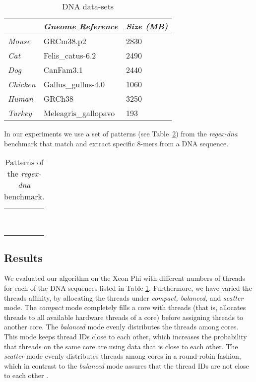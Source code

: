 \documentclass[conference]{IEEEtran}
\begin{document}
\begin{table}[h]
		\renewcommand{\arraystretch}{1.3}
		\caption{DNA data-sets}
		\label{table:dna-sequences}
		\centering
		\begin{tabular}{lll}
			\toprule
			& \emph{Gneome Reference}   	 & \emph{Size (MB)} \\ \midrule
			\emph{Mouse}   & GRCm38.p2        		 & 2830      \\ 
			\emph{Cat}     & Felis\_catus-6.2  	 & 2490      \\ 
			\emph{Dog}     & CanFam3.1          	 & 2440      \\ 
			\emph{Chicken} & Gallus\_gullus-4.0	 & 1060      \\ 
			\emph{Human}   & GRCh38            	 & 3250      \\ 
			\emph{Turkey}  & Meleagris\_gallopavo   & 193       \\ \bottomrule
		\end{tabular}
\end{table}
	
In our experiments we use a set of patterns (see Table~\ref{table:regex}) from the \emph{regex-dna} \cite{REGEX_DNA} benchmark that match and extract specific 8-mers from a DNA sequence. 

\begin{table}[ht]
			\renewcommand{\arraystretch}{1.3}
			\caption{Patterns of the \emph{regex-dna} benchmark.}
			\label{table:regex}
			\centering
			\begin{tabular}{ p{2.5cm} p{2.5cm} }
				\hline 
				 & \\
				 & \\
				 & \\
				 & \\
				 & \\
				 & \\
				 & \\
				 & \\
				 & \\
				\hline
			\end{tabular}
\end{table}


\subsection{Results}

We evaluated our algorithm on the Xeon Phi with different numbers of threads for each of the DNA sequences listed in Table \ref{table:dna-sequences}. Furthermore, we have varied the threads affinity, by allocating the threads under \emph{compact, balanced,} and \emph{scatter} mode. The \emph{compact} mode completely fills a core with threads (that is, allocates threads to all available hardware threads of a core) before assigning threads to another core. The \emph{balanced} mode evenly distributes the threads among cores. This mode keeps thread IDs close to each other, which increases the probability that threads on the same core are using data that is close to each other. The \emph{scatter} mode evenly distributes threads among cores in a round-robin fashion, which in contrast to the \emph{balanced} mode assures that the thread IDs are not close to each other \cite{barth2013best}. 
\end{document}
